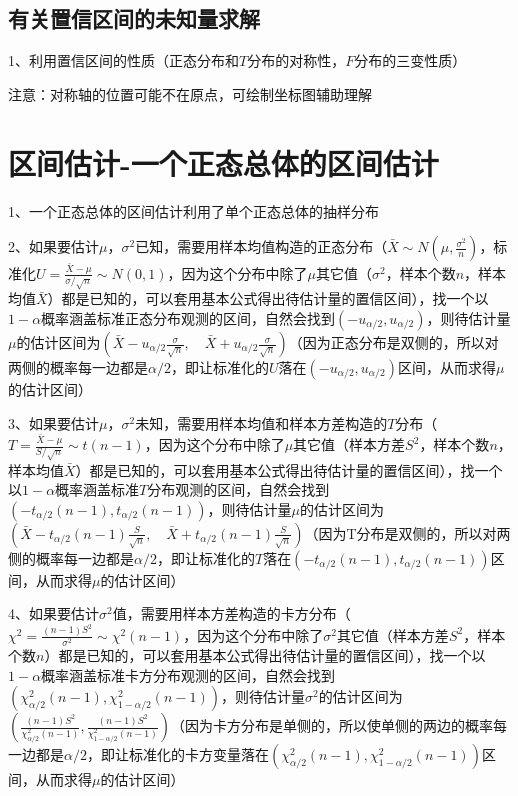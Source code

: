 \subsection{有关置信区间的未知量求解}

1、利用置信区间的性质（正态分布和$T$分布的对称性，$F$分布的三变性质）

注意：对称轴的位置可能不在原点，可绘制坐标图辅助理解

\section{区间估计-一个正态总体的区间估计}

1、一个正态总体的区间估计利用了单个正态总体的抽样分布

2、如果要估计$\mu$，$\sigma^{2}$已知，需要用样本均值构造的正态分布（$\bar{X} \sim N\left(\mu, \frac{\sigma^{2}}{n}\right)$，标准化$U=\frac{\bar{X}-\mu}{\sigma / \sqrt{n}} \sim N(0,1)$，因为这个分布中除了$\mu$其它值（$\sigma^{2}$，样本个数$n$，样本均值$\bar{X}$）都是已知的，可以套用基本公式得出待估计量的置信区间），找一个以$1−α$概率涵盖标准正态分布观测的区间，自然会找到$(−u_{\alpha/2},u_{\alpha/2})$，则待估计量$\mu$的估计区间为$\left(\bar{X}-u_{{\alpha}/{2}} \frac{\sigma}{\sqrt{n}}, \quad \bar{X}+u_{{\alpha}/{2}} \frac{\sigma}{\sqrt{n}}\right) $（因为正态分布是双侧的，所以对两侧的概率每一边都是$\alpha/2$，即让标准化的$U$落在$(-u_{{\alpha}/{2}},u_{{\alpha}/{2}})$区间，从而求得$\mu$的估计区间）

3、如果要估计$\mu$，$\sigma^{2}$未知，需要用样本均值和样本方差构造的$T$分布（$T=\frac{\bar{X}-\mu}{S / \sqrt{n}} \sim t(n-1)$，因为这个分布中除了$\mu$其它值（样本方差$S^2$，样本个数$n$，样本均值$\bar{X}$）都是已知的，可以套用基本公式得出待估计量的置信区间），找一个以$1−α$概率涵盖标准$T$分布观测的区间，自然会找到$(−t_{\alpha/2}(n-1),t_{\alpha/2}(n-1))$，则待估计量$\mu$的估计区间为$\left(\bar{X}-t_{{\alpha}/{2}}(n-1) \frac{S}{\sqrt{n}}, \quad \bar{X}+t_{{\alpha}/{2}}(n-1) \frac{S}{\sqrt{n}}\right)$（因为T分布是双侧的，所以对两侧的概率每一边都是$\alpha/2$，即让标准化的$T$落在$(−t_{\alpha/2}(n-1),t_{\alpha/2}(n-1))$区间，从而求得$\mu$的估计区间）

4、如果要估计$\sigma^{2}$值，需要用样本方差构造的卡方分布（$\chi^{2}=\frac{(n-1) S^{2}}{\sigma^{2}} \sim \chi^{2}(n-1)$，因为这个分布中除了$\sigma^{2}$其它值（样本方差$S^2$，样本个数$n$）都是已知的，可以套用基本公式得出待估计量的置信区间），找一个以$1−α$概率涵盖标准卡方分布观测的区间，自然会找到$(\chi_{{\alpha}/{2}}^{2}(n-1),\chi_{1-{\alpha}/{2}}^{2}(n-1))$，则待估计量$\sigma^{2}$的估计区间为$\left(\frac{(n-1) S^{2}}{\chi_{{\alpha}/{2}}^{2}(n-1)}, \frac{(n-1) S^{2}}{\chi_{1-{\alpha}/{2}}^{2}(n-1)}\right)$（因为卡方分布是单侧的，所以使单侧的两边的概率每一边都是$\alpha/2$，即让标准化的卡方变量落在$(\chi_{{\alpha}/{2}}^{2}(n-1),\chi_{1-{\alpha}/{2}}^{2}(n-1))$区间，从而求得$\mu$的估计区间）

